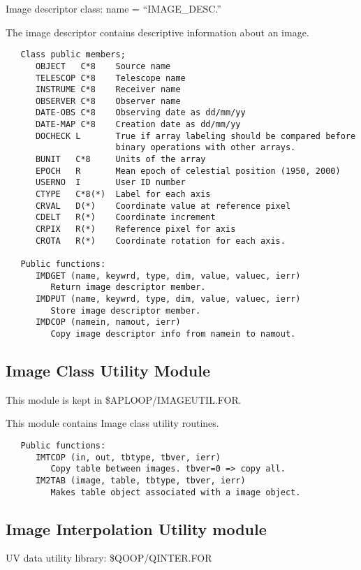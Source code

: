    Image descriptor class:  name = ``IMAGE\_DESC.''

   The image descriptor contains descriptive information about an image.

{\small\begin{verbatim}
   Class public members;
      OBJECT   C*8    Source name
      TELESCOP C*8    Telescope name
      INSTRUME C*8    Receiver name
      OBSERVER C*8    Observer name
      DATE-OBS C*8    Observing date as dd/mm/yy
      DATE-MAP C*8    Creation date as dd/mm/yy
      DOCHECK L       True if array labeling should be compared before
                      binary operations with other arrays.
      BUNIT   C*8     Units of the array
      EPOCH   R       Mean epoch of celestial position (1950, 2000)
      USERNO  I       User ID number
      CTYPE   C*8(*)  Label for each axis
      CRVAL   D(*)    Coordinate value at reference pixel
      CDELT   R(*)    Coordinate increment
      CRPIX   R(*)    Reference pixel for axis
      CROTA   R(*)    Coordinate rotation for each axis.

   Public functions:
      IMDGET (name, keywrd, type, dim, value, valuec, ierr)
         Return image descriptor member.
      IMDPUT (name, keywrd, type, dim, value, valuec, ierr)
         Store image descriptor member.
      IMDCOP (namein, namout, ierr)
         Copy image descriptor info from namein to namout.

\end{verbatim}}
\subsection{Image Class Utility Module}

   This module is kept in \$APLOOP/IMAGEUTIL.FOR.

   This module contains Image class utility routines.

{\small\begin{verbatim}
   Public functions:
      IMTCOP (in, out, tbtype, tbver, ierr)
         Copy table between images. tbver=0 => copy all.
      IM2TAB (image, table, tbtype, tbver, ierr)
         Makes table object associated with a image object.

\end{verbatim}}
\subsection{Image Interpolation Utility module}
   UV data utility library: \$QOOP/QINTER.FOR

